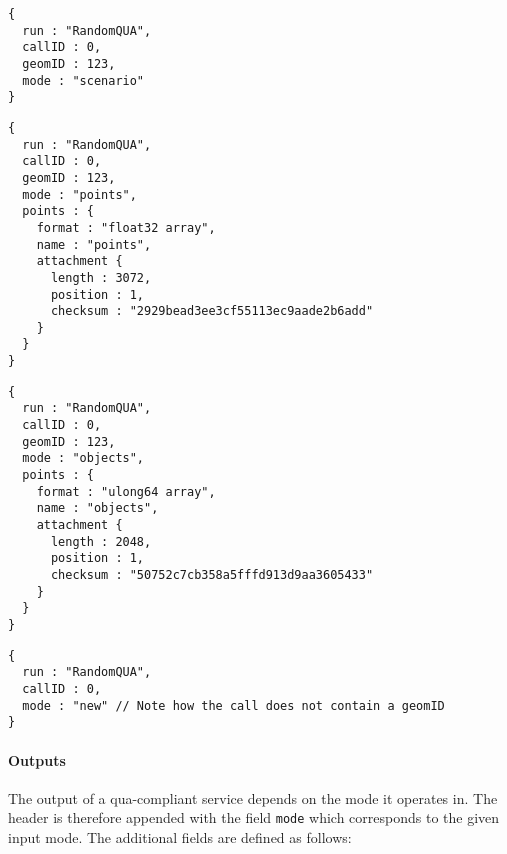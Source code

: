 \begin{lstlisting}[caption={A qua-compliant service run request for mode \texttt{scenario}}, label={lst:quacompliantinput:scenario}]
{
  run : "RandomQUA",
  callID : 0,
  geomID : 123,
  mode : "scenario"
}
\end{lstlisting}

\begin{lstlisting}[caption={A qua-compliant service run request for mode \texttt{points}}, label={lst:quacompliantinput:points}]
{
  run : "RandomQUA",
  callID : 0,
  geomID : 123,
  mode : "points",
  points : {
    format : "float32 array",
    name : "points",
    attachment {
      length : 3072,
      position : 1,
      checksum : "2929bead3ee3cf55113ec9aade2b6add"
    }
  }
}
\end{lstlisting}

\begin{lstlisting}[caption={A qua-compliant service run request for mode \texttt{objects}}, label={lst:quacompliantinput:objects}]
{
  run : "RandomQUA",
  callID : 0,
  geomID : 123,
  mode : "objects",
  points : {
    format : "ulong64 array",
    name : "objects",
    attachment {
      length : 2048,
      position : 1,
      checksum : "50752c7cb358a5fffd913d9aa3605433"
    }
  }
}
\end{lstlisting}


\begin{lstlisting}[caption={A qua-compliant service run request for mode \texttt{new}}, label={lst:quacompliantinput:new}]
{
  run : "RandomQUA",
  callID : 0,
  mode : "new" // Note how the call does not contain a geomID
}
\end{lstlisting}

\paragraph{Outputs}
The output of a qua-compliant service depends on the mode it operates in. The header is therefore appended with the field \texttt{mode} which corresponds to the given input mode. The additional fields are defined as follows:

